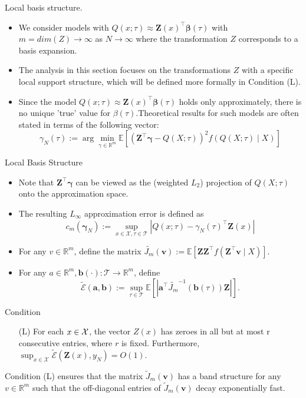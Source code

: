 \documentclass[11pt]{beamer}
\begin{document}
\begin{frame}{Local basis structure.}
\begin{itemize}
\item We consider models with $Q(x ; \tau) \approx \mathbf{Z}(x)^{\top} \boldsymbol{\beta}(\tau)$ with $m=dim(Z)\to \infty$ as $N \to \infty$ where the transformation $Z$ corresponds to a basis expansion. 
\item The analysis in this section focuses on the transformations $Z$ with a specific local support structure, which will be defined more formally in Condition (L).
\item Since the model $Q(x ; \tau) \approx \mathbf{Z}(x)^{\top} \boldsymbol{\beta}(\tau)$ holds only approximately, there is no
unique 'true' value for $\beta(\tau)$.Theoretical results for such models are often stated
in terms of the following vector:
$$
\gamma_{N}(\tau):=\arg \min _{\gamma \in \mathbb{R}^{m}} \mathbb{E}\left[\left(\mathbf{Z}^{\top} \boldsymbol{\gamma}-Q(X ; \tau)\right)^{2} f(Q(X ; \tau) \mid X)\right]
$$

\end{itemize}
\end{frame}
\begin{frame}{Local Basis Structure}
\begin{itemize}
\item Note that $\mathbf{Z}^{\top} \boldsymbol{\gamma}$ can
be viewed as the (weighted $L_2$) projection of $Q(X;\tau)$ onto the approximation
space.
\item The resulting $L_{\infty}$ approximation error is defined as 
$$
c_{m}\left(\boldsymbol{\gamma}_{N}\right):=\sup _{x \in \mathcal{X}, \tau \in \mathcal{T}}\left|Q(x ; \tau)-\gamma_{N}(\tau)^{\top} \mathbf{Z}(x)\right|
$$
\item For any $v \in \mathbb{R}^m$, define the matrix $\widetilde{J_m}(\mathbf{v}):=\mathbb{E}\left[\mathbf{Z} \mathbf{Z}^{\top} f\left(\mathbf{Z}^{\top} \mathbf{v} \mid X\right)\right]$. 
\item For any $a \in \mathbb{R}^{m}, \mathbf{b}(\cdot): \mathcal{T} \rightarrow \mathbb{R}^{m}$, define
$$
\widetilde{\mathcal{E}}(\mathbf{a}, \mathbf{b}):=\sup _{\tau \in \mathcal{T}} \mathbb{E}\left[\left|\mathbf{a}^{\top} \widetilde{J_m}^{-1}(\mathbf{b}(\tau)) \mathbf{Z}\right|\right].
$$
\end{itemize}

\end{frame}

\begin{frame}{Condition}
\begin{itemize}
\item[(L)] For each $x\in \mathcal{X}$, the vector $Z(x)$ has zeroes in all but at most r consecutive
entries, where $r$ is fixed. Furthermore, $\sup _{x \in \mathcal{X}} \widetilde{\mathcal{E}}\left(\mathbf{Z}(x), y_{N}\right)=O(1)$.
\end{itemize}
{\color{blue}
Condition (L) ensures that the matrix $\widetilde{J}_{m}(\mathbf{v})$ has a band structure for any $v\in \mathbb{R}^m$ such that the off-diagonal entries of $\widetilde{J}_{m}(\mathbf{v})$ decay exponentially fast.
}
\end{frame}
\end{document}
